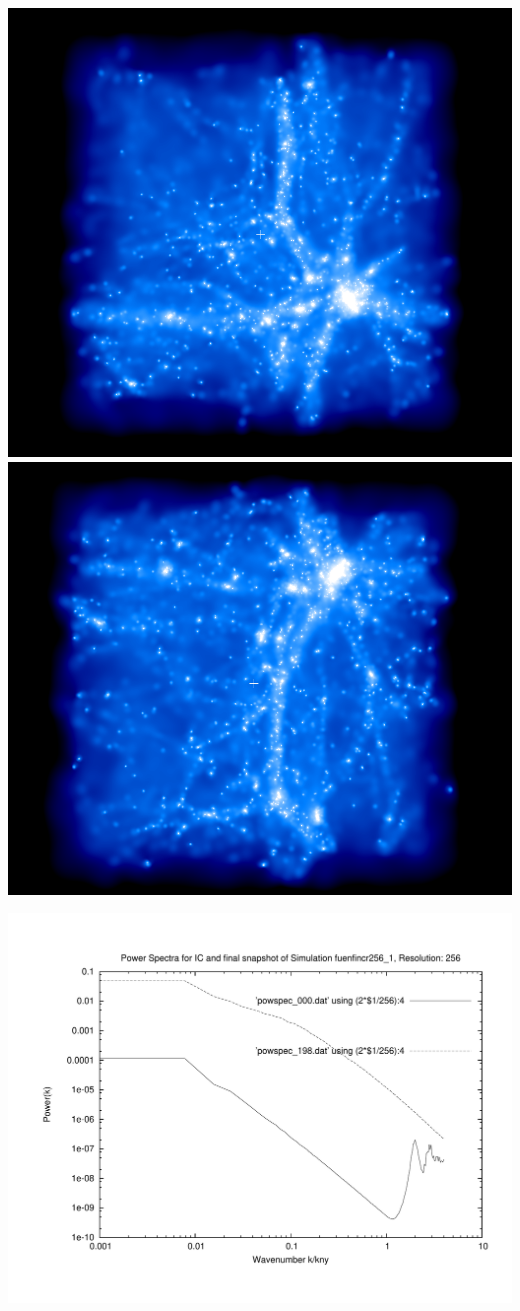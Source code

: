 \includegraphics[scale=0.2]{r256/fuenfincr256_1/1.png} 
\includegraphics[scale=0.2]{r256/fuenfincr256_1/2.png}

\includegraphics[scale=0.5]{r256/fuenfincr256_1/plot_powspec_fuenfincr256_1}

